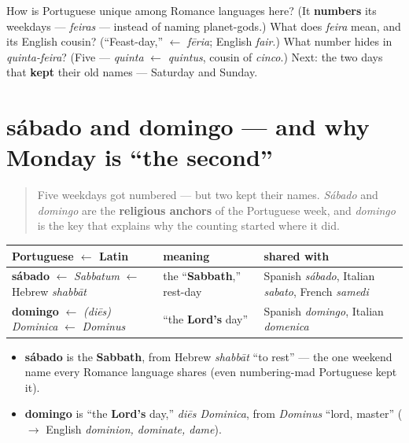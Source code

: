 \begin{tcolorbox}[breakable,colback=teal!4,colframe=teal!35!black,title={Before you move on}]
How is Portuguese unique among Romance languages here? (It \textbf{numbers} its weekdays — \emph{feiras} — instead of naming planet-gods.) What does \emph{feira} mean, and its English cousin? (\textquotedblleft{}Feast-day,\textquotedblright{} $\leftarrow$ \emph{fēria}; English \emph{fair}.) What number hides in \emph{quinta-feira}? (Five — \emph{quinta} $\leftarrow$ \emph{quintus}, cousin of \emph{cinco}.) Next: the two days that \textbf{kept} their old names — Saturday and Sunday.
\end{tcolorbox}
\section[sábado, domingo]{sábado and domingo — and why Monday is \textquotedblleft{}the second\textquotedblright{}}

\label{lesson:PT-C07-dias-2}



\begin{quote}
Five weekdays got numbered — but two kept their names. \emph{Sábado} and \emph{domingo} are the \textbf{religious anchors} of the Portuguese week, and \emph{domingo} is the key that explains why the counting started where it did.
\end{quote}

\begin{cousinweb}
\noindent
\begin{tabularx}{\linewidth}{@{}>{\raggedright\arraybackslash}X>{\raggedright\arraybackslash}X>{\raggedright\arraybackslash}X@{}}
\toprule
\textbf{Portuguese $\leftarrow$ Latin} & \textbf{meaning} & \textbf{shared with} \\
\midrule
\textbf{sábado} $\leftarrow$ \emph{Sabbatum} $\leftarrow$ Hebrew \emph{shabbāt} & the \textquotedblleft{}\textbf{Sabbath},\textquotedblright{} rest-day & Spanish \emph{sábado}, Italian \emph{sabato}, French \emph{samedi} \\
\textbf{domingo} $\leftarrow$ \emph{(diēs) Dominica} $\leftarrow$ \emph{Dominus} & \textquotedblleft{}the \textbf{Lord's} day\textquotedblright{} & Spanish \emph{domingo}, Italian \emph{domenica} \\
\bottomrule
\end{tabularx}

\begin{itemize}
\raggedright
  \item \textbf{sábado} is the \textbf{Sabbath}, from Hebrew \emph{shabbāt} \textquotedblleft{}to rest\textquotedblright{} — the one weekend name every Romance language shares (even numbering-mad Portuguese kept it).
  \item \textbf{domingo} is \textquotedblleft{}the \textbf{Lord's} day,\textquotedblright{} \emph{diēs Dominica}, from \emph{Dominus} \textquotedblleft{}lord, master\textquotedblright{} ($\to$ English \emph{dominion, dominate, dame}).
\end{itemize}
\end{cousinweb}

